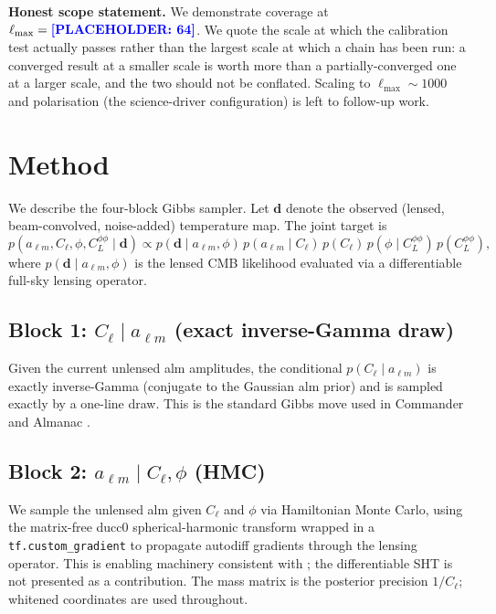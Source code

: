 \documentclass[twocolumn,superscriptaddress,aps,prl,floatfix]{revtex4-2}
\newcommand{\alm}{a_{\ell m}}
\newcommand{\cl}{C_\ell}
\newcommand{\clpp}{C_L^{\phi\phi}}
\newcommand{\lmax}{\ell_{\max}}
\newcommand{\placeholder}[1]{\textcolor{blue}{\textbf{[PLACEHOLDER: #1]}}}
\begin{document}
\textbf{Honest scope statement.}
We demonstrate coverage at $\lmax = \placeholder{64}$. We quote the scale at
which the calibration test actually passes rather than the largest scale at
which a chain has been run: a converged result at a smaller scale is worth more
than a partially-converged one at a larger scale, and the two should not be
conflated.
Scaling to $\lmax \sim 1000$ and polarisation (the science-driver configuration)
is left to follow-up work.


\section{Method}
\label{sec:method}

We describe the four-block Gibbs sampler.
Let $\mathbf{d}$ denote the observed (lensed, beam-convolved, noise-added)
temperature map.
The joint target is
\begin{equation}
    p(\alm, \cl, \phi, \clpp \mid \mathbf{d})
    \propto p(\mathbf{d} \mid \alm, \phi)\,
            p(\alm \mid \cl)\,p(\cl)\,p(\phi \mid \clpp)\,p(\clpp),
\end{equation}
where $p(\mathbf{d} \mid \alm, \phi)$ is the lensed CMB likelihood evaluated via
a differentiable full-sky lensing operator.

\subsection{Block 1: $\cl \mid \alm$ (exact inverse-Gamma draw)}
\label{sec:block1}

Given the current unlensed alm amplitudes, the conditional $p(\cl \mid \alm)$
is exactly inverse-Gamma (conjugate to the Gaussian alm prior) and is sampled
exactly by a one-line draw.
This is the standard Gibbs move used in Commander \citep{Commander} and
Almanac \citep{Almanac}.

\subsection{Block 2: $\alm \mid \cl, \phi$ (HMC)}
\label{sec:block2}

We sample the unlensed alm given $\cl$ and $\phi$ via Hamiltonian Monte Carlo,
using the matrix-free ducc0 spherical-harmonic transform \citep{Reinecke:2023}
wrapped in a \texttt{tf.custom\_gradient} to propagate autodiff gradients through
the lensing operator.
This is enabling machinery consistent with \citet{Flinch}; the differentiable
SHT is not presented as a contribution.
The mass matrix is the posterior precision $1/\cl$; whitened coordinates are
used throughout.
\end{document}
